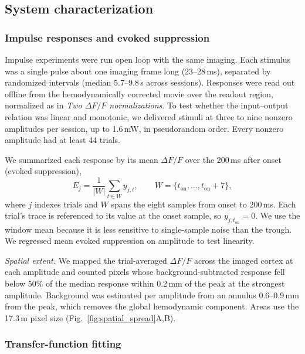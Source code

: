 \subsection*{System characterization}

\subsubsection*{Impulse responses and evoked suppression}
\label{sec:inhib_energy}

Impulse experiments were run open loop with the same imaging.
Each stimulus was a single pulse about one imaging frame long (23--28\,ms), separated by randomized intervals (median 5.7--9.8\,s across sessions).
Responses were read out offline from the hemodynamically corrected movie over the readout region, normalized as in \emph{Two $\Delta F/F$ normalizations}.
To test whether the input--output relation was linear and monotonic, we delivered stimuli at three to nine nonzero amplitudes per session, up to 1.6\,mW, in pseudorandom order.
Every nonzero amplitude had at least 44 trials.

We summarized each response by its mean $\Delta F/F$ over the 200\,ms after onset (evoked suppression),
%
\begin{equation}
    E_{j} = \frac{1}{\lvert W \rvert}\sum_{t \in W} y_{j,t},
    \qquad W = \{t_{\mathrm{on}},\ldots,t_{\mathrm{on}}+7\},
    \label{eq:inhib_energy}
\end{equation}
%
where $j$ indexes trials and $W$ spans the eight samples from onset to 200\,ms.
Each trial's trace is referenced to its value at the onset sample, so $y_{j,t_{\mathrm{on}}} = 0$.
We use the window mean because it is less sensitive to single-sample noise than the trough.
We regressed mean evoked suppression on amplitude to test linearity.

\emph{Spatial extent.} We mapped the trial-averaged $\Delta F/F$ across the imaged cortex at each amplitude and counted pixels whose background-subtracted response fell below 50\% of the median response within 0.2\,mm of the peak at the strongest amplitude.
Background was estimated per amplitude from an annulus 0.6--0.9\,mm from the peak, which removes the global hemodynamic component.
Areas use the 17.3\,\textmu m pixel size (Fig.~\ref{fig:spatial_spread}A,B).

\subsubsection*{Transfer-function fitting}
\label{sec:tf_fitting}

